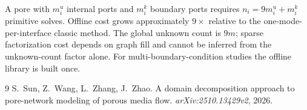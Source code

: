 \documentclass[11pt,a4paper]{article}
\begin{document}
A pore with $m_i^u$ internal ports and $m_i^k$ boundary ports requires
$n_i = 9m_i^u + m_i^k$ primitive solves.  Offline cost grows approximately
$9\times$ relative to the one-mode-per-interface classic method.
The global unknown count is $9m$; sparse factorization cost depends on
graph fill and cannot be inferred from the unknown-count factor alone.
For multi-boundary-condition studies the offline library is built once.

\begin{thebibliography}{9}
S.~Sun, Z.~Wang, L.~Zhang, J.~Zhao.
\newblock A domain decomposition approach to pore-network modeling of porous
  media flow.
\newblock \textit{arXiv:2510.13429v2}, 2026.
\end{thebibliography}
\end{document}
